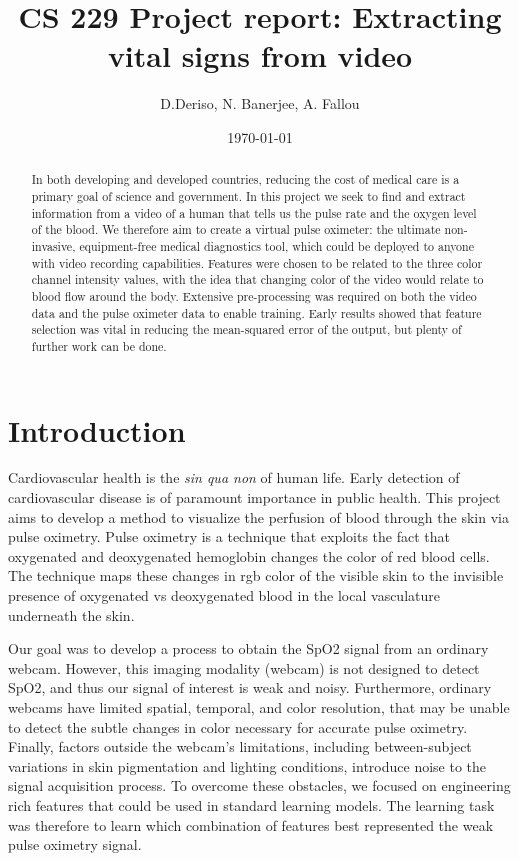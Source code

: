 \documentclass[12pt]{article}
\begin{document}
  \title{CS 229 Project report: Extracting vital signs from video}
  \author{D.Deriso, N. Banerjee, A. Fallou}
  \date{\today}
  \maketitle
  \thispagestyle{empty}
\begin{abstract}
In both developing and developed countries, reducing the cost of medical care is a primary goal of science and government. In this project we seek to find and extract information from a video of a human that tells us the pulse rate and the oxygen level of the blood. We therefore aim to create a virtual pulse oximeter: the ultimate non-invasive, equipment-free medical diagnostics tool, which could be deployed to anyone with video recording capabilities. Features were chosen to be related to the three color channel intensity values, with the idea that changing color of the video would relate to blood flow around the body. Extensive pre-processing was required on both the video data and the pulse oximeter data to enable training. Early results showed that feature selection was vital in reducing the mean-squared error of the output, but plenty of further work can be done.

\end{abstract}


\section{Introduction}
%
\small  

Cardiovascular health is the \emph{sin qua non} of human life. Early detection of cardiovascular disease is of paramount importance in public health. This project aims to develop a method to visualize the perfusion of blood through the skin via pulse oximetry. Pulse oximetry is a technique that exploits the fact that oxygenated and deoxygenated hemoglobin changes the color of red blood cells. The technique maps these changes in rgb color of the visible skin to the invisible presence of oxygenated vs deoxygenated blood in the local vasculature underneath the skin.

Our goal was to develop a process to obtain the SpO2 signal from an ordinary webcam. However, this imaging modality (webcam) is not designed to detect SpO2, and thus our signal of interest is weak and noisy. Furthermore, ordinary webcams have limited spatial, temporal, and color resolution, that may be unable to detect the subtle changes in color necessary for accurate pulse oximetry. Finally, factors outside the webcam’s limitations, including between-subject variations in skin pigmentation and lighting conditions, introduce noise to the signal acquisition process. To overcome these obstacles, we focused on engineering rich features that could be used in standard learning models. The learning task was therefore to learn which combination of features best represented the weak pulse oximetry signal.
\end{document}
